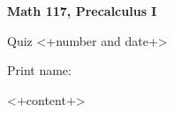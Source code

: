 \documentclass[noanswers, letterpaper, 12pt]{exam}
\begin{document}
\begin{minipage}{.3\textwidth}
  \centerline{\bf Math 117, Precalculus I}
  \medskip
  \centerline{Quiz <+number and date+>}
\end{minipage}%
\begin{minipage}{.7\textwidth}
  \hfill\large {} \hfill \else Print name:\enspace\hrulefill \fi
  \medskip
\end{minipage}


\begin{questions}

  <+content+>
\end{questions}
\end{document}
